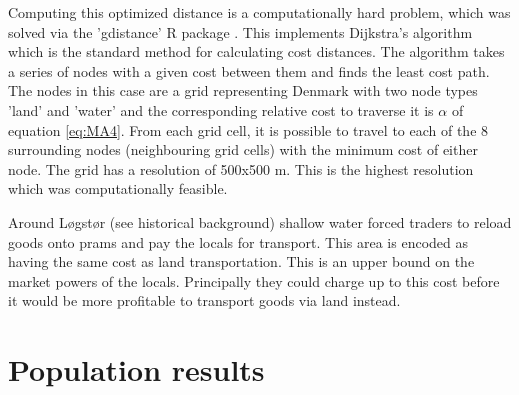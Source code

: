 Computing this optimized distance is a computationally hard problem, which was solved via the 'gdistance' R package \citep{VanEtten2017}. This implements Dijkstra's algorithm \citep{Dijkstra1959} which is the standard method for calculating cost distances. The algorithm takes a series of nodes with a given cost between them and finds the least cost path. The nodes in this case are a grid representing Denmark with two node types 'land' and 'water' and the corresponding relative cost to traverse it is $\alpha$ of equation \ref{eq:MA4}. From each grid cell, it is possible to travel to each of the 8 surrounding nodes (neighbouring grid cells) with the minimum cost of either node. The grid has a resolution of 500x500 m. This is the highest resolution which was computationally feasible. 

Around Løgstør (see historical background) shallow water forced traders to reload goods onto prams and pay the locals for transport. This area is encoded as having the same cost as land transportation. This is an upper bound on the market powers of the locals. Principally they could charge up to this cost before it would be more profitable to transport goods via land instead.

\section{Population results} \label{extra_pop_res}

